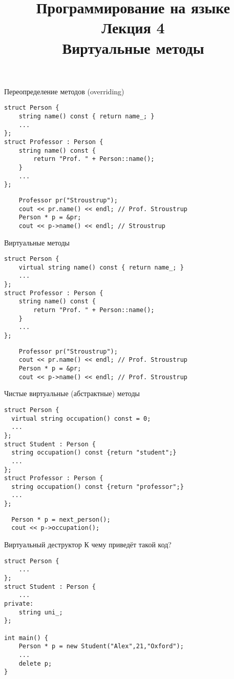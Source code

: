\documentclass{beamer}
\title{{\bf Программирование на языке \langcpp\protect\\Лекция
4\protect\vspace{1em}\\}Виртуальные методы}
\begin{document}
\begin{frame} 
  \titlepage
\end{frame}

\begin{frame}[fragile]{Переопределение методов (overriding)}
    \begin{lstlisting}
struct Person {
    string name() const { return name_; }
    ...
};
struct Professor : Person {
    string name() const { 
        return "Prof. " + Person::name();
    }
    ...
};
    \end{lstlisting}

\begin{lstlisting}
    Professor pr("Stroustrup");
    cout << pr.name() << endl; // Prof. Stroustrup
    Person * p = &pr;
    cout << p->name() << endl; // Stroustrup 
\end{lstlisting}
\end{frame}

\begin{frame}[fragile]{Виртуальные методы}
    \begin{lstlisting}
struct Person {
    virtual string name() const { return name_; }
    ...
};
struct Professor : Person {
    string name() const { 
        return "Prof. " + Person::name();
    }
    ...
};
    \end{lstlisting}

\begin{lstlisting}
    Professor pr("Stroustrup");
    cout << pr.name() << endl; // Prof. Stroustrup
    Person * p = &pr;
    cout << p->name() << endl; // Prof. Stroustrup 
\end{lstlisting}
\end{frame}

\begin{frame}[fragile]{Чистые виртуальные (абстрактные) методы}
    \begin{lstlisting}
struct Person {
  virtual string occupation() const = 0;
  ...
};
struct Student : Person {
  string occupation() const {return "student";}
  ...
};
struct Professor : Person {
  string occupation() const {return "professor";}
  ...
};
\end{lstlisting}
\begin{lstlisting}
  Person * p = next_person();
  cout << p->occupation(); 
\end{lstlisting}
\end{frame}

\begin{frame}[fragile]{Виртуальный деструктор}
К чему приведёт такой код?
    \begin{lstlisting}
struct Person {
    ...
};
struct Student : Person {
    ...
private:
    string uni_;
};

int main() {
    Person * p = new Student("Alex",21,"Oxford");
    ...
    delete p;
}
    \end{lstlisting}
\end{frame}
\end{document}
